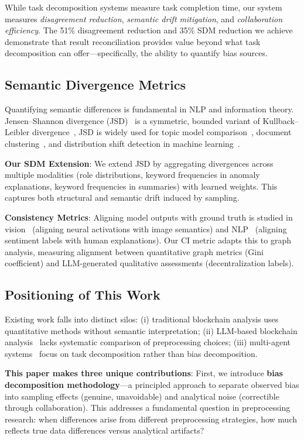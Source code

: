 \documentclass[conference]{IEEEtran}
\begin{document}
While task decomposition systems measure task completion time, our system measures \textit{disagreement reduction}, \textit{semantic drift mitigation}, and \textit{collaboration efficiency}. The 51\% disagreement reduction and 35\% SDM reduction we achieve demonstrate that result reconciliation provides value beyond what task decomposition can offer---specifically, the ability to quantify bias sources.

\subsection{Semantic Divergence Metrics}

Quantifying semantic differences is fundamental in NLP and information theory. Jensen--Shannon divergence (JSD)~\cite{lin1991jsd} is a symmetric, bounded variant of Kullback--Leibler divergence~\cite{kullback1951},
JSD is widely used for topic model comparison~\cite{blei2003lda}, document clustering~\cite{endres2003}, and distribution shift detection in machine learning~\cite{rabanser2019}.

\textbf{Our SDM Extension}: We extend JSD by aggregating divergences across multiple modalities (role distributions, keyword frequencies in anomaly explanations, keyword frequencies in summaries) with learned weights. This captures both structural and semantic drift induced by sampling.

\textbf{Consistency Metrics}: Aligning model outputs with ground truth is studied in vision~\cite{zhao2020consistency} (aligning neural activations with image semantics) and NLP~\cite{ribeiro2020beyond} (aligning sentiment labels with human explanations). Our CI metric adapts this to graph analysis, measuring alignment between quantitative graph metrics (Gini coefficient) and LLM-generated qualitative assessments (decentralization labels).

\subsection{Positioning of This Work}

Existing work falls into distinct silos: (i) traditional blockchain analysis uses quantitative methods without semantic interpretation; (ii) LLM-based blockchain analysis~\cite{lei2025llm} lacks systematic comparison of preprocessing choices; (iii) multi-agent systems~\cite{qian2023communicative,li2024multiagent} focus on task decomposition rather than bias decomposition.

\textbf{This paper makes three unique contributions}: First, we introduce \textbf{bias decomposition methodology}---a principled approach to separate observed bias into sampling effects (genuine, unavoidable) and analytical noise (correctible through collaboration). This addresses a fundamental question in preprocessing research: when differences arise from different preprocessing strategies, how much reflects true data differences versus analytical artifacts?
\end{document}
